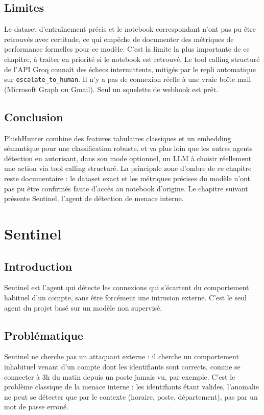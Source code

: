 \documentclass[12pt,a4paper]{report}
\begin{document}
\section{Limites}

Le dataset d'entraînement précis et le notebook correspondant n'ont pas pu être retrouvés avec certitude, ce qui empêche de documenter des métriques de performance formelles pour ce modèle. C'est la limite la plus importante de ce chapitre, à traiter en priorité si le notebook est retrouvé. Le tool calling structuré de l'API Groq connaît des échecs intermittents, mitigés par le repli automatique sur \texttt{escalate\_to\_human}. Il n'y a pas de connexion réelle à une vraie boîte mail (Microsoft Graph ou Gmail). Seul un squelette de webhook est prêt.

\section{Conclusion}

PhishHunter combine des features tabulaires classiques et un embedding sémantique pour une classification robuste, et va plus loin que les autres agents détection en autorisant, dans son mode optionnel, un LLM à choisir réellement une action via tool calling structuré. La principale zone d'ombre de ce chapitre reste documentaire : le dataset exact et les métriques précises du modèle n'ont pas pu être confirmés faute d'accès au notebook d'origine. Le chapitre suivant présente Sentinel, l'agent de détection de menace interne.

\chapter{Sentinel}

\section{Introduction}

Sentinel est l'agent qui détecte les connexions qui s'écartent du comportement habituel d'un compte, sans être forcément une intrusion externe. C'est le seul agent du projet basé sur un modèle non supervisé.

\section{Problématique}

Sentinel ne cherche pas un attaquant externe : il cherche un comportement inhabituel venant d'un compte dont les identifiants sont corrects, comme se connecter à 3h du matin depuis un poste jamais vu, par exemple. C'est le problème classique de la menace interne : les identifiants étant valides, l'anomalie ne peut se détecter que par le contexte (horaire, poste, département), pas par un mot de passe erroné.
\end{document}
